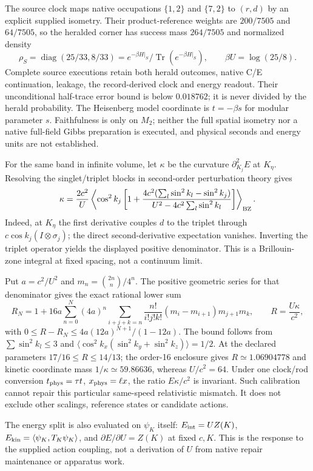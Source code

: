 The source clock maps native occupations $\{1,2\}$ and $\{7,2\}$ to
$(r,d)$ by an explicit supplied isometry. Their product-reference weights
are $200/7505$ and $64/7505$, so the heralded corner has success mass
$264/7505$ and normalized density
\[
 \rho_S=\operatorname{diag}(25/33,8/33)
       =e^{-\beta H|_S}/\operatorname{Tr}(e^{-\beta H|_S}),
 \qquad \beta U=\log(25/8).
\]
Complete source executions retain both herald outcomes, native C/E
continuation, leakage, the record-derived clock and energy readout. Their
unconditional half-trace error bound is below $0.018762$; it is never
divided by the herald probability. The Heisenberg model coordinate is
$t=-\beta s$ for modular parameter $s$. Faithfulness is only on $M_2$;
neither the full spatial isometry nor a native full-field Gibbs preparation
is executed, and physical seconds and energy units are not established.

For the same band in infinite volume, let $\kappa$ be the curvature
$\partial_{K_j}^2E$ at $K_\eta$. Resolving the singlet/triplet blocks in
second-order perturbation theory gives
\[
 \kappa=\frac{2c^2}{U}\left\langle \cos^2 k_j
 \left[1+\frac{4c^2(\sum_l\sin^2 k_l-\sin^2 k_j)}
                   {U^2-4c^2\sum_l\sin^2 k_l}\right]\right\rangle_{\rm BZ}.
\]
Indeed, at $K_\eta$ the first derivative couples $d$ to the triplet through
$c\cos k_j(I\otimes\sigma_j)$; the direct second-derivative expectation vanishes.
Inverting the triplet operator yields the displayed positive denominator.
This is a Brillouin-zone integral at fixed spacing, not a continuum limit.

Put $a=c^2/U^2$ and $m_n=\binom{2n}{n}/4^n$. The positive geometric
series for that denominator gives the exact rational lower sum
\[
 R_N=1+16a\sum_{n=0}^N(4a)^n
   \sum_{i+j+k=n}\frac{n!}{i!j!k!}(m_i-m_{i+1})m_{j+1}m_k,
 \qquad R=\frac{U\kappa}{c^2},
\]
with $0\le R-R_N\le4a(12a)^{N+1}/(1-12a)$. The bound follows from
$\sum\sin^2 k_l\le3$ and
$\langle\cos^2 k_x(\sin^2 k_y+\sin^2 k_z)\rangle=1/2$.
At the declared parameters $17/16\le R\le14/13$; the
order-16 enclosure gives $R\simeq1.06904778$ and kinetic coordinate mass
$1/\kappa\simeq59.86636$, whereas $U/c^2=64$.
Under one clock/rod conversion $t_{\rm phys}=\tau t$,
$x_{\rm phys}=\ell x$, the ratio $E\kappa/c^2$ is invariant. Such
calibration cannot repair this particular same-speed relativistic mismatch.
It does not exclude other scalings, reference states or candidate actions.

The energy split is also evaluated on $\psi_K$ itself:
$E_{\rm int}=UZ(K)$, $E_{\rm kin}=\langle\psi_K,T_K\psi_K\rangle$,
and $\partial E/\partial U=Z(K)$ at fixed $c,K$. This is the response to
the supplied action coupling, not a derivation of $U$ from native repair
maintenance or apparatus work.

